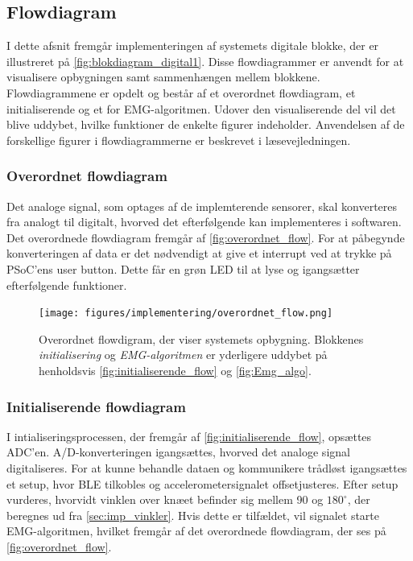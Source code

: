 \subsection{Flowdiagram} \label{sec:flow}
I dette afsnit fremgår implementeringen af systemets digitale blokke, der er illustreret på \autoref{fig:blokdiagram_digital1}. 
Disse flowdiagrammer er anvendt for at visualisere opbygningen samt sammenhængen mellem blokkene. 
Flowdiagrammene er opdelt og består af et overordnet flowdiagram, et initialiserende og et for EMG-algoritmen. 
Udover den visualiserende del vil det blive uddybet, hvilke funktioner de enkelte figurer indeholder. 
Anvendelsen af de forskellige figurer i flowdiagrammerne er beskrevet i læsevejledningen.

\subsubsection{Overordnet flowdiagram}
Det analoge signal, som optages af de implemterende sensorer, skal konverteres fra analogt til digitalt, hvorved det efterfølgende kan implementeres i softwaren. 
Det overordnede flowdiagram fremgår af \autoref{fig:overordnet_flow}. 
For at påbegynde konverteringen af data er det nødvendigt at give et interrupt ved at trykke på PSoC'ens user button. 
Dette får en grøn LED til at lyse og igangsætter efterfølgende funktioner. 

\begin{figure}[H]
\centering
\texttt{[image: figures/implementering/overordnet\_flow.png]}
\caption{Overordnet flowdigram, der viser systemets opbygning. Blokkenes \emph{initialisering} og \emph{EMG-algoritmen} er yderligere uddybet på henholdsvis \autoref{fig:initialiserende_flow} og \autoref{fig:Emg_algo}.}
\label{fig:overordnet_flow}
\end{figure}

\subsubsection{Initialiserende flowdiagram}
I intialiseringsprocessen, der fremgår af \autoref{fig:initialiserende_flow}, opsættes ADC'en. 
A/D-konverteringen igangsættes, hvorved det analoge signal digitaliseres. 
For at kunne behandle dataen og kommunikere trådløst igangsættes et setup, hvor BLE tilkobles og accelerometersignalet offsetjusteres. 
Efter setup vurderes, hvorvidt vinklen over knæet befinder sig mellem 90 og $180^{\circ}$, der beregnes ud fra \autoref{sec:imp_vinkler}. 
Hvis dette er tilfældet, vil signalet starte EMG-algoritmen, hvilket fremgår af det overordnede flowdiagram, der ses på \autoref{fig:overordnet_flow}. 

